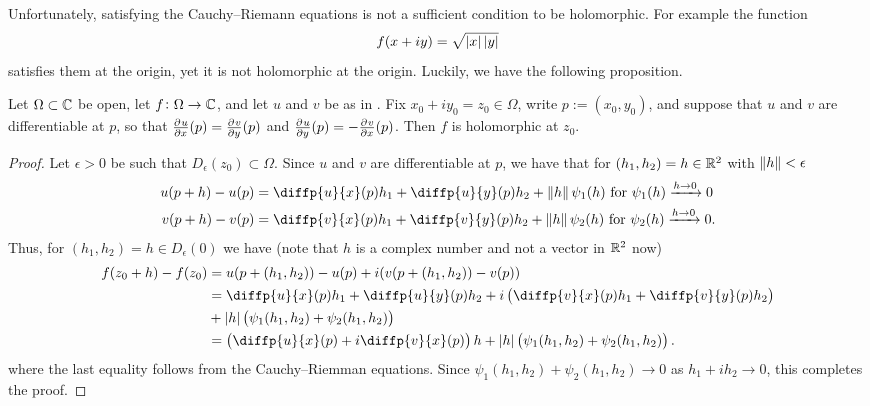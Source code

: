 \documentclass[11pt,a4paper]{article}
\begin{document}
\renewcommand*{\arraystretch}{1}

\begin{remark}
  Unfortunately, satisfying the Cauchy--Riemann equations is not 
  a sufficient condition to be holomorphic.
  For example the function
  \[
    f(x + iy) = \sqrt{\left\lvert x\right\rvert \left\lvert y\right\rvert}
  \]
  satisfies them at the origin, yet it is not holomorphic at the origin.
  Luckily, we have the following proposition.
\end{remark}

\begin{proposition}
  Let $\Omega \subset \mathbb{C}$ be open, let $f \colon \Omega \to \mathbb{C}$,
  and let $u$ and $v$ be as in .
  Fix $x_0 + i y_0 = z_0 \in \Omega$, write $p := (x_0,y_0)$,
  and suppose that $u$ and $v$ are differentiable at $p$,
  so that $\pd{u}{x}(p) = \pd{v}{y}(p)$ and $\pd{u}{y}(p) = - \pd{v}{x}(p)$.
  Then $f$ is holomorphic at $z_0$.
\end{proposition}
\begin{proof}
  Let $\epsilon > 0$ be such that $D_{\epsilon}(z_0) \subset \Omega$.
  Since $u$ and $v$ are differentiable at $p$, we have that
  for $(h_1,h_2) = h \in \mathbb{R}^2$ with $\left\lVert h\right\rVert < \epsilon$
  \begin{align*}
    u(p + h) - u(p) &= \diffp{u}{x}(p) h_1 + \diffp{u}{y}(p) h_2 +
    \norm h \psi_1(h) \text{ for } \psi_1(h) \taking{h \to 0} 0 \\
    v(p + h) - v(p) &= \diffp{v}{x}(p) h_1 + \diffp{v}{y}(p) h_2 +
    \norm h \psi_2(h) \text{ for } \psi_2(h) \taking{h \to 0} 0.
  \end{align*}
  Thus, for $(h_1,h_2) = h \in D_{\epsilon}(0)$ we have (note that $h$
  is a complex number and not a vector in $\mathbb{R}^2$ now)
  \begin{align*}
    f(z_0 + h) - f(z_0) &= u(p + (h_1,h_2)) - u(p) + i (v(p + (h_1,h_2)) - v(p)) \\
    &= \diffp{u}{x}(p) h_1 + \diffp{u}{y}(p) h_2 +
      i\del{\diffp{v}{x}(p) h_1 + \diffp{v}{y}(p) h_2} \\ &+
      \abs h \del{\psi_1(h_1,h_2) + \psi_2(h_1,h_2)} \\
    &= \del{\diffp{u}{x}(p) + i \diffp{v}{x}(p)} h +
      \abs h \del{\psi_1(h_1,h_2) + \psi_2(h_1,h_2)}.
  \end{align*}
  where the last equality follows from the Cauchy--Riemman equations.
  Since $\psi_1(h_1,h_2) + \psi_2(h_1,h_2) \to 0$ as $h_1 + i h_2 \to 0$,
  this completes the proof.
\end{proof}
\end{document}
